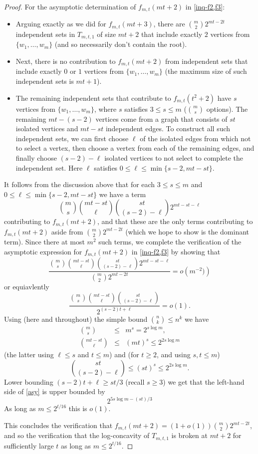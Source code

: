 \documentclass[10pt,a4paper]{amsart}
\begin{document}
\begin{proof}
For the asymptotic determination of $f_{m,t}(mt+2)$ in \eqref{inq-f2,f3}: 
\begin{itemize}
\item Arguing exactly as we did for $f_{m,t}(mt+3)$, there are $\binom{m}{2}2^{mt-2t}$ independent sets in $T_{m,t,1}$ of size $mt+2$ that include exactly $2$ vertices from $\{w_1, \ldots, w_m\}$ (and so necessarily don't contain the root). 
\item Next, there is no contribution to $f_{m,t}(mt+2)$ from independent sets that include exactly $0$ or $1$ vertices from $\{w_1, \ldots, w_m\}$ (the maximum size of such independent sets is $mt+1$).
\item The remaining independent sets that contribute to $f_{m,t}(t^2+2)$ have $s$ vertices from $\{w_1, \ldots, w_m\}$, where $s$ satisfies $3 \leq s \leq m$ ($\binom{m}{s}$ options). The remaining $mt-(s-2)$ vertices come from a graph that consists of $st$ isolated vertices and $mt-st$ independent edges. To construct all such independent sets, we can first choose $\ell$ of the isolated edges from which not to select a vertex, then choose a vertex from each of the remaining edges, and finally choose $(s-2)-\ell$ isolated vertices to not select to complete the independent set. Here $\ell$ satisfies $0 \leq \ell \leq \min\{s-2,mt-st\}$.   
\end{itemize}
It follows from the discussion above that for each $3 \leq s \leq m$ and $0 \leq \ell \leq \min\{s-2,mt-st\}$ we have a term
$$
\binom{m}{s}\binom{mt-st}{\ell}\binom{st}{(s-2)-\ell}2^{mt-st-\ell}
$$
contributing to $f_{m,t}(mt+2)$, and that these are the only terms contributing to $f_{m,t}(mt+2)$ aside from $\binom{m}{2}2^{mt-2t}$ (which we hope to show is the dominant term). Since there at most $m^2$ such terms, we complete the verification of the asymptotic expression for $f_{m,t}(mt+2)$ in \eqref{inq-f2,f3} by showing that
$$
\frac{\binom{m}{s}\binom{mt-st}{\ell}\binom{st}{(s-2)-\ell}2^{mt-st-\ell}}{\binom{m}{2}2^{mt-2t}} = o\left(m^{-2})\right)
$$
or equiavlently
\begin{equation} \label{asy}
\frac{\binom{m}{s}\binom{mt-st}{\ell}\binom{st}{(s-2)-\ell}}{2^{(s-2)t+\ell}} = o(1).
\end{equation}
Using (here and throughout) the simple bound $\binom{n}{k} \leq n^k$ we have
\begin{eqnarray*}
\binom{m}{s} & \leq & m^s = 2^{s \log m}, \\
\binom{mt-st}{\ell} & \leq & (mt)^s \leq 2^{2s\log m}
\end{eqnarray*}
(the latter using $\ell \leq s$ and $t \leq m$) and (for $t \geq 2$, and using $s,t \leq m$)
$$
\binom{st}{(s-2)-\ell} \leq (st)^s \leq 2^{2s\log m}.
$$
Lower bounding $(s-2)t+\ell \geq st/3$ (recall $s \geq 3$) we get that the left-hand side of \eqref{asy} is upper bounded by 
$$
2^{5s\log m-(st)/3}
$$ 
As long as $m \leq 2^{t/16}$ this is $o(1)$.
 
This concludes the verification that $f_{m,t}(mt+2)=(1+o(1))\binom{m}{2}2^{mt-2t}$, and so the verification that the log-concavity of $T_{m,t,1}$ is broken at $mt+2$ for sufficiently large $t$ as long as $m \leq 2^{t/16}$.
\end{proof}
\end{document}
